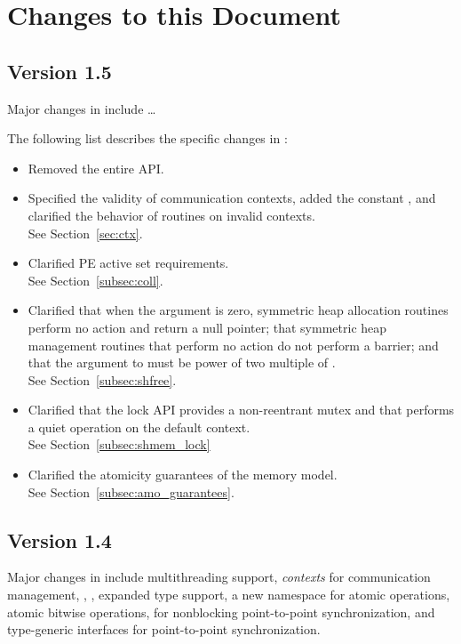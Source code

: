 \chapter{Changes to this Document}\label{sec:changelog}

\section{Version 1.5}
Major changes in \openshmem[1.5] include \dots

The following list describes the specific changes in \openshmem[1.5]:
\begin{itemize}
%
\item Removed the entire \openshmem \Fortran API. 
%
\item Specified the validity of communication contexts, added the constant
  , and clarified the behavior of
   routines on invalid contexts.
  \\ See Section~\ref{sec:ctx}.
%
\item Clarified \ac{PE} active set requirements.
    \\See Section~\ref{subsec:coll}.
%
\item Clarified that when the  argument is zero, symmetric heap
    allocation routines perform no action and return a null pointer; that
    symmetric heap management routines that perform no action do not perform a
    barrier; and that the  argument to  must
    be power of two multiple of .
    \\See Section~\ref{subsec:shfree}.
%
\item Clarified that the \openshmem lock API provides a non-reentrant mutex and
    that  performs a quiet operation on the default
    context.
    \\See Section~\ref{subsec:shmem_lock}
%
\item Clarified the atomicity guarantees of the \openshmem memory model.
    \\See Section~\ref{subsec:amo_guarantees}.
%
\end{itemize}

\section{Version 1.4}
Major changes in \openshmem[1.4] include
multithreading support,
\emph{contexts} for communication management,
,
,
expanded type support,
a new namespace for atomic operations,
atomic bitwise operations,
 for nonblocking point-to-point synchronization,
and \Cstd[11] type-generic interfaces for point-to-point synchronization.

